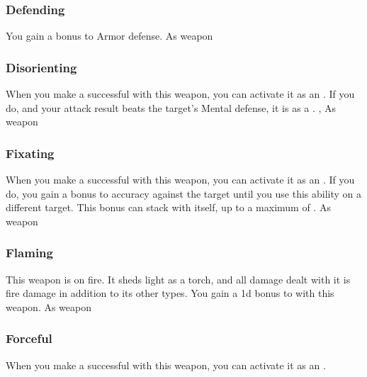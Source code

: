 \lowercase{\hypertarget{item:Defending}{}}\label{item:Defending}
\hypertarget{item:Defending}{\subsubsection{Defending\hfill{}}}
You gain a  bonus to Armor defense.
 
 As weapon
\lowercase{\hypertarget{item:Disorienting}{}}\label{item:Disorienting}
\hypertarget{item:Disorienting}{\subsubsection{Disorienting\hfill{}}}
When you make a successful  with this weapon, you can activate it as an .
If you do, and your attack result beats the target's Mental defense, it is \disoriented as a .
 , 
 As weapon
\lowercase{\hypertarget{item:Fixating}{}}\label{item:Fixating}
\hypertarget{item:Fixating}{\subsubsection{Fixating\hfill{}}}
When you make a successful  with this weapon, you can activate it as an .
If you do, you gain a  bonus to accuracy against the target until you use this ability on a different target.
This bonus can stack with itself, up to a maximum of .
 
 As weapon
\lowercase{\hypertarget{item:Flaming}{}}\label{item:Flaming}
\hypertarget{item:Flaming}{\subsubsection{Flaming\hfill{}}}
This weapon is on fire.
It sheds light as a torch, and all damage dealt with it is fire damage in addition to its other types.
You gain a \plus1d bonus to  with this weapon.
 
 As weapon
\lowercase{\hypertarget{item:Forceful}{}}\label{item:Forceful}
\hypertarget{item:Forceful}{\subsubsection{Forceful\hfill{}}}
When you make a successful  with this weapon, you can activate it as an .
